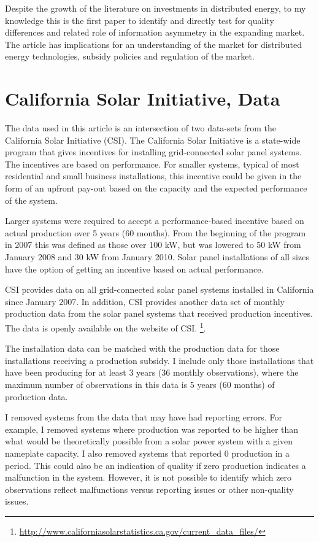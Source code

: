 \documentclass[a4paper]{article}
\begin{document}
Despite the growth of the literature on investments in distributed energy, to my knowledge this is the first paper to identify and directly test for quality differences and related role of information asymmetry in the expanding market. The article has implications for an understanding of the market for distributed energy technologies, subsidy policies and regulation of the market.

\section{California Solar Initiative, Data}

The data used in this article is an intersection of two data-sets from the California Solar Initiative (CSI). The California Solar Initiative is a state-wide program that gives incentives for installing grid-connected solar panel systems. The incentives are based on performance. For smaller systems, typical of most residential and small business installations, this incentive could be given in the form of an upfront pay-out based on the capacity and the expected performance of the system.

Larger systems were required to accept a performance-based incentive based on actual production over 5 years (60 months). From the beginning of the program in 2007 this was defined as those over 100 kW, but was lowered to 50 kW from January 2008 and 30 kW from January 2010. Solar panel installations of all sizes have the option of getting an incentive based on actual performance.

CSI provides data on all grid-connected solar panel systems installed in California since January 2007. In addition, CSI provides another data set of monthly production data from the solar panel systems that received production incentives. The data is openly available on the website of CSI. \footnote{\url{http://www.californiasolarstatistics.ca.gov/current_data_files/}}. %

The installation data can be matched with the production data for those installations receiving a production subsidy. I include only those installations that have been producing for at least 3 years (36 monthly observations), where the maximum number of observations in this data is 5 years (60 months) of production data.

I removed systems from the data that may have had reporting errors. For example, I removed systems where production was reported to be higher than what would be theoretically possible from a solar power system with a given nameplate capacity. I also removed systems that reported 0 production in a period. This could also be an indication of quality if zero production indicates a malfunction in the system. However, it is not possible to identify which zero observations reflect malfunctions versus reporting issues or other non-quality issues.
\end{document}
